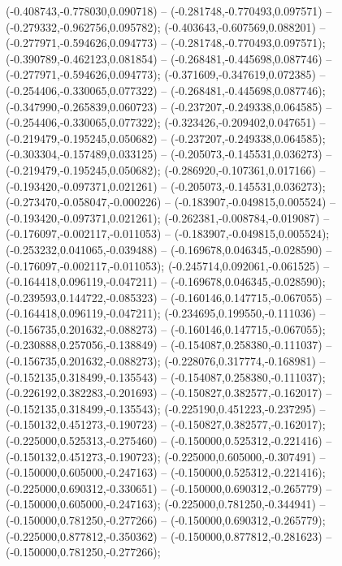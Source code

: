  (-0.408743,-0.778030,0.090718) -- (-0.281748,-0.770493,0.097571) -- (-0.279332,-0.962756,0.095782);
 (-0.403643,-0.607569,0.088201) -- (-0.277971,-0.594626,0.094773) -- (-0.281748,-0.770493,0.097571);
 (-0.390789,-0.462123,0.081854) -- (-0.268481,-0.445698,0.087746) -- (-0.277971,-0.594626,0.094773);
 (-0.371609,-0.347619,0.072385) -- (-0.254406,-0.330065,0.077322) -- (-0.268481,-0.445698,0.087746);
 (-0.347990,-0.265839,0.060723) -- (-0.237207,-0.249338,0.064585) -- (-0.254406,-0.330065,0.077322);
 (-0.323426,-0.209402,0.047651) -- (-0.219479,-0.195245,0.050682) -- (-0.237207,-0.249338,0.064585);
 (-0.303304,-0.157489,0.033125) -- (-0.205073,-0.145531,0.036273) -- (-0.219479,-0.195245,0.050682);
 (-0.286920,-0.107361,0.017166) -- (-0.193420,-0.097371,0.021261) -- (-0.205073,-0.145531,0.036273);
 (-0.273470,-0.058047,-0.000226) -- (-0.183907,-0.049815,0.005524) -- (-0.193420,-0.097371,0.021261);
 (-0.262381,-0.008784,-0.019087) -- (-0.176097,-0.002117,-0.011053) -- (-0.183907,-0.049815,0.005524);
 (-0.253232,0.041065,-0.039488) -- (-0.169678,0.046345,-0.028590) -- (-0.176097,-0.002117,-0.011053);
 (-0.245714,0.092061,-0.061525) -- (-0.164418,0.096119,-0.047211) -- (-0.169678,0.046345,-0.028590);
 (-0.239593,0.144722,-0.085323) -- (-0.160146,0.147715,-0.067055) -- (-0.164418,0.096119,-0.047211);
 (-0.234695,0.199550,-0.111036) -- (-0.156735,0.201632,-0.088273) -- (-0.160146,0.147715,-0.067055);
 (-0.230888,0.257056,-0.138849) -- (-0.154087,0.258380,-0.111037) -- (-0.156735,0.201632,-0.088273);
 (-0.228076,0.317774,-0.168981) -- (-0.152135,0.318499,-0.135543) -- (-0.154087,0.258380,-0.111037);
 (-0.226192,0.382283,-0.201693) -- (-0.150827,0.382577,-0.162017) -- (-0.152135,0.318499,-0.135543);
 (-0.225190,0.451223,-0.237295) -- (-0.150132,0.451273,-0.190723) -- (-0.150827,0.382577,-0.162017);
 (-0.225000,0.525313,-0.275460) -- (-0.150000,0.525312,-0.221416) -- (-0.150132,0.451273,-0.190723);
 (-0.225000,0.605000,-0.307491) -- (-0.150000,0.605000,-0.247163) -- (-0.150000,0.525312,-0.221416);
 (-0.225000,0.690312,-0.330651) -- (-0.150000,0.690312,-0.265779) -- (-0.150000,0.605000,-0.247163);
 (-0.225000,0.781250,-0.344941) -- (-0.150000,0.781250,-0.277266) -- (-0.150000,0.690312,-0.265779);
 (-0.225000,0.877812,-0.350362) -- (-0.150000,0.877812,-0.281623) -- (-0.150000,0.781250,-0.277266);
